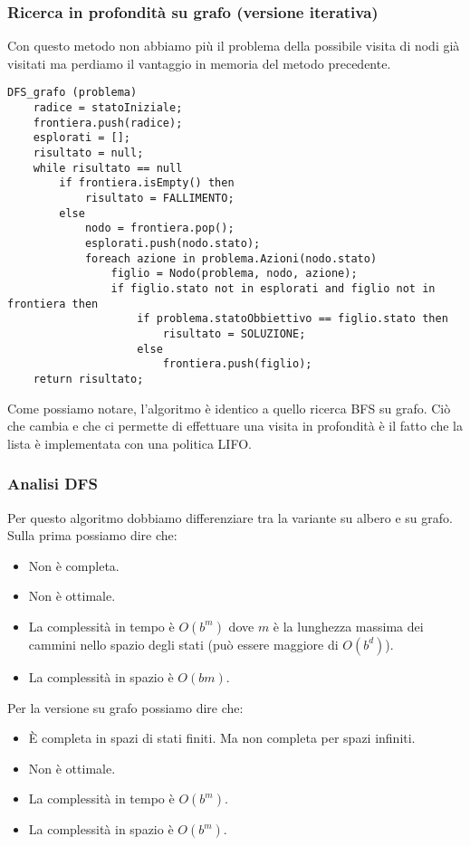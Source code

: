 \subsubsection{Ricerca in profondit\`a su grafo (versione iterativa)}
Con questo metodo non abbiamo pi\`u il problema della possibile visita di nodi gi\`a visitati
ma perdiamo il vantaggio in memoria del metodo precedente.
\begin{lstlisting}[style=pseudo-style]
DFS_grafo (problema)
	radice = statoIniziale;
	frontiera.push(radice);
	esplorati = [];
	risultato = null;
	while risultato == null
		if frontiera.isEmpty() then
			risultato = FALLIMENTO;
		else
			nodo = frontiera.pop();
			esplorati.push(nodo.stato);
			foreach azione in problema.Azioni(nodo.stato)
				figlio = Nodo(problema, nodo, azione);
				if figlio.stato not in esplorati and figlio not in frontiera then
					if problema.statoObbiettivo == figlio.stato then
						risultato = SOLUZIONE;
					else
						frontiera.push(figlio);
	return risultato;	
\end{lstlisting}
Come possiamo notare, l'algoritmo \`e identico a quello ricerca BFS su grafo. Ci\`o che cambia
e che ci permette di effettuare una visita in profondit\`a \`e il fatto che la lista \`e
implementata con una politica LIFO.

\subsubsection{Analisi DFS}
Per questo algoritmo dobbiamo differenziare tra la variante su albero e su grafo. Sulla prima
possiamo dire che:
\begin{itemize}
	\item Non \`e completa.
	\item Non \`e ottimale.
	\item La complessit\`a in tempo \`e $O(b^m)$ dove $m$ \`e la lunghezza massima dei cammini
	      nello spazio degli stati (pu\`o essere maggiore di $O(b^d)$).
	\item La complessit\`a in spazio \`e $O(bm)$.
\end{itemize}
Per la versione su grafo possiamo dire che:
\begin{itemize}
	\item \`E completa in spazi di stati finiti. Ma non completa per spazi infiniti.
	\item Non \`e ottimale.
	\item La complessit\`a in tempo \`e $O(b^m)$.
	\item La complessit\`a in spazio \`e $O(b^m)$.
\end{itemize}

